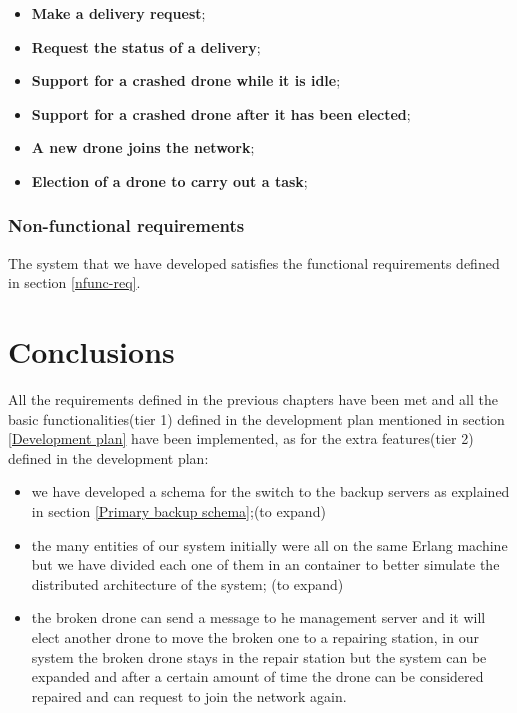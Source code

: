 \documentclass[a4paper, oneside]{memoir}
\begin{document}
\begin{itemize}
\item \textbf{Make a delivery request};
\item \textbf{Request the status of a delivery};
\item \textbf{Support for a crashed drone while it is idle};
\item \textbf{Support for a crashed drone after it has been elected};
\item \textbf{A new drone joins the network};
\item \textbf{Election of a drone to carry out a task};
\end{itemize}

\subsection{Non-functional requirements}
The system that we have developed satisfies the functional requirements defined in section \ref{nfunc-req}.






\chapter{Conclusions}
All the requirements defined in the previous chapters have been met and all the basic functionalities(tier 1) defined in the development plan mentioned in section \ref{Development plan} have been implemented, as for the extra features(tier 2) defined in the development plan:
\begin{itemize}
\item we have developed a schema for the switch to the backup servers as explained in section \ref{Primary backup schema};(to expand)
\item the many entities of our system initially were all on the same Erlang machine but we have divided each one of them in an container to better simulate the distributed architecture of the system; (to expand)
\item the broken drone can send a message to he management server and it will elect another drone to move the broken one to a repairing station, in our system the broken drone stays in the repair station but the system can be expanded and after a certain amount of time the drone can be considered repaired and can request to join the network again.
\end{itemize}
\end{document}
